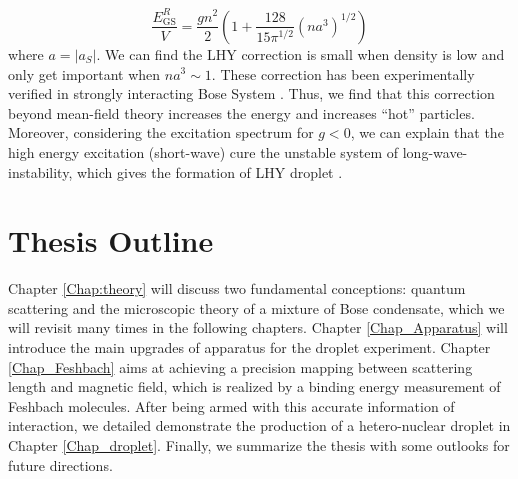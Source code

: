 \begin{equation}
\frac{E_{\text{GS}}^R}{V}=\frac{g n^2}{2}\left(1+\frac{128}{15\pi ^{1/2}} \left(n a^3\right)^{1/2}\right)
\end{equation}
where $a=\left|a_S\right|$. We can find the LHY correction is small when density is low and only get important when $n a^3\sim 1$. These correction has been experimentally verified in strongly interacting Bose System \cite{Navon2011}. Thus, we find that this correction beyond mean-field theory increases the energy and increases ``hot'' particles. Moreover, considering the excitation spectrum for $g<0$, we can explain that the high energy excitation (short-wave) cure the unstable system of long-wave-instability, which gives the formation of LHY droplet \cite{petrov2015}.


\section{Thesis Outline}
\label{sec:intro-outline}
Chapter \ref{Chap:theory} will discuss two fundamental conceptions: quantum scattering and the microscopic theory of a mixture of Bose condensate, which we will revisit many times in the following chapters. Chapter \ref{Chap_Apparatus} will introduce the main upgrades of apparatus for the droplet experiment. Chapter \ref{Chap_Feshbach} aims at achieving a precision mapping between scattering length and magnetic field, which is realized by a binding energy measurement of Feshbach molecules. After being armed with this accurate information of interaction, we detailed demonstrate the production of a hetero-nuclear droplet in Chapter \ref{Chap_droplet}. 
Finally, we summarize the thesis with some outlooks for future directions.

\chapterend
